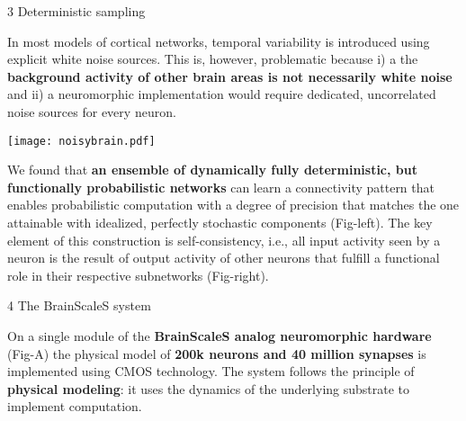 \begin{frame}
\begin{columns}
\begin{column}{0.99\textwidth}
\begin{columns}[t]
				\begin{column}{0.32\textwidth}


					\begin{block}{\large 3 Deterministic sampling}
					\blockSpaceOne

					\begin{adjustwidth}{1.cm}{1.cm}
					\justifying
					In most models of cortical networks, temporal variability is introduced using explicit white noise sources.
					This is, however, problematic because i) a the \textbf{background activity of other brain areas is not necessarily white noise} and ii) a neuromorphic implementation would require dedicated, uncorrelated noise sources for every neuron. 
					\end{adjustwidth}

					\secondBlockImSpace
					\begin{center}
						\texttt{[image: noisybrain.pdf]}
					\end{center}
					\secondBlockImSpace

					\begin{adjustwidth}{1.cm}{1.cm}
					\justifying

					We  found \cite{dold2019stochasticity} that \textbf{an  ensemble  of  dynamically  fully  deterministic,  but functionally probabilistic networks} can learn a connectivity pattern that enables probabilistic computation with a degree of precision that matches the one attainable with idealized,  perfectly  stochastic  components (Fig-left).
					The  key  element  of  this  construction  is  self-consistency, i.e.,  all input activity seen by a neuron is the result of output activity of other neurons that fulfill a functional role in their respective subnetworks (Fig-right).
					
					\end{adjustwidth}

					\blockSpaceOne
					\end{block}

					\interBlockSpaceOne

					
				\begin{block}{\large 4 The BrainScaleS system}
					\blockSpaceOne


					\justifying
					\begin{adjustwidth}{1.cm}{1.cm}
					 On a single module of the \textbf{BrainScaleS \cite{schemmel2010wafer} analog neuromorphic hardware} (Fig-A) the physical model of \textbf{200k neurons and 40 million synapses} is implemented using CMOS technology.
					 The system follows the principle of \textbf{physical modeling}: it uses the dynamics of the underlying substrate to implement computation.
					 

\end{adjustwidth}
\end{block}
\end{column}
\end{columns}
\end{column}
\end{columns}
\end{frame}
